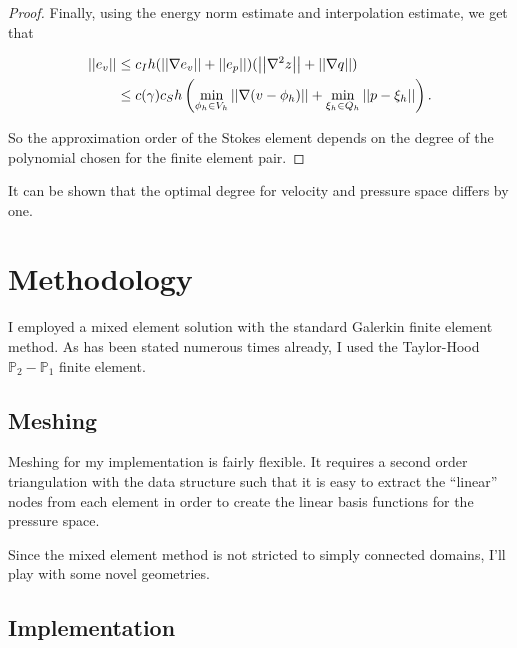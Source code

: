 \documentclass[12pt]{article}
\begin{document}
\begin{proof}
                    Finally, using the energy norm estimate and interpolation estimate, we get
                    that

                    \begin{align*}
                        \left|\left|e_v\right|\right| &\leq c_I h (\left|\left|\nabla e_v\right|\right| + \left|\left|e_p\right|\right|)(\left|\left|\nabla^2 z\right|\right| +
                        \left|\left|\nabla q\right|\right|) \\
                        &\leq c(\gamma) c_S h \left( \min_{\phi_h \in V_h} \left|\left| \nabla(v -
                        \phi_h)\right|\right| + \min_{\xi_h \in Q_h} \left|\left|p - \xi_h\right|\right| \right).
                    \end{align*}

                    So the approximation order of the Stokes element depends on the degree of
                    the polynomial chosen for the finite element pair.
                \end{proof}

                It can be shown that the optimal degree for velocity and pressure space
                differs by one.

                \section{Methodology}

                I employed a mixed element solution with the standard Galerkin finite
                element method. As has been stated numerous times already, I used the
                Taylor-Hood $\mathbb{P}_2 - \mathbb{P}_1$ finite element.

                \subsection{Meshing}

                Meshing for my implementation is fairly flexible. It requires a
                second order triangulation with the data structure such that it
                is easy to extract the ``linear'' nodes from each element in
                order to create the linear basis functions for the pressure space.

                Since the mixed element method is not stricted to simply
                connected domains, I'll play with some novel geometries.

                \subsection{Implementation}
\end{document}

